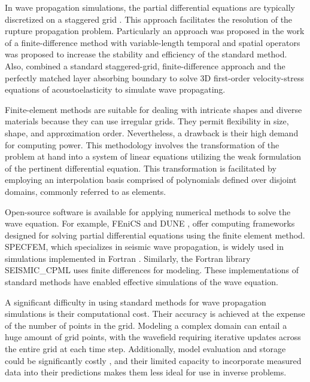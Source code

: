\documentclass[11pt,twoside]{article}
\begin{document}
In wave propagation simulations, the partial differential equations are typically discretized on a staggered grid 
\citep{madariaga_dynamics_1976,Virieux1986}. This approach facilitates the resolution of the rupture propagation problem. Particularly 
an approach was proposed in the work of  a finite-difference method with variable-length temporal and spatial 
operators was proposed to increase the stability and efficiency of the standard method. Also,  
combined a standard staggered-grid, finite-difference approach and the perfectly matched layer absorbing boundary to solve 3D 
first-order velocity-stress equations of acoustoelasticity to simulate wave propagating.

Finite-element methods are suitable for dealing with intricate shapes and diverse materials because they can use irregular grids. They 
permit flexibility in size, shape, and approximation order. Nevertheless, a drawback is their high demand for computing power. This 
methodology involves the transformation of the problem at hand into a system of linear equations utilizing the weak formulation of the 
pertinent differential equation. This transformation is facilitated by employing an interpolation basis comprised of polynomials defined 
over disjoint domains, commonly referred to as elements.

Open-source software is available for applying numerical methods to solve the wave equation. For example, FEniCS and DUNE 
\citep{FEniCS,sander_dune_2020}, offer computing frameworks designed for solving partial differential equations using the 
finite element method. SPECFEM, which specializes in seismic wave propagation, is widely used 
in simulations implemented in Fortran \citep{dimitri_komatitsch_2023_10415228,komatitsch_2024_10823181}. Similarly, 
the Fortran library SEISMIC\_CPML \citep{komatitsch_unsplit_2007} uses finite differences for modeling. These 
implementations of standard methods have enabled effective simulations of the wave equation.

A significant difficulty in using standard methods for wave propagation simulations is their computational cost. Their accuracy is 
achieved at the expense of the number of points in the grid. Modeling a complex domain can entail a huge amount of grid points, with 
the wavefield requiring iterative updates across the entire grid at each time step. Additionally, model evaluation and storage could be 
significantly costly , and their limited capacity to incorporate measured data into their 
predictions makes them less ideal for use in inverse problems.
\end{document}
